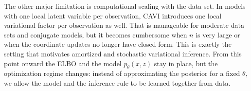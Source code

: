 The other major limitation is computational scaling with the data set.
In models with one local latent variable per observation, CAVI introduces one local variational factor per observation as well.
That is manageable for moderate data sets and conjugate models, but it becomes cumbersome when $n$ is very large or when the coordinate updates no longer have closed form.
This is exactly the setting that motivates amortized and stochastic variational inference.
From this point onward the ELBO and the model \(p_\theta(x,z)\) stay in place, but the optimization regime changes: instead of approximating the posterior for a fixed \(\theta\), we allow the model and the inference rule to be learned together from data.
